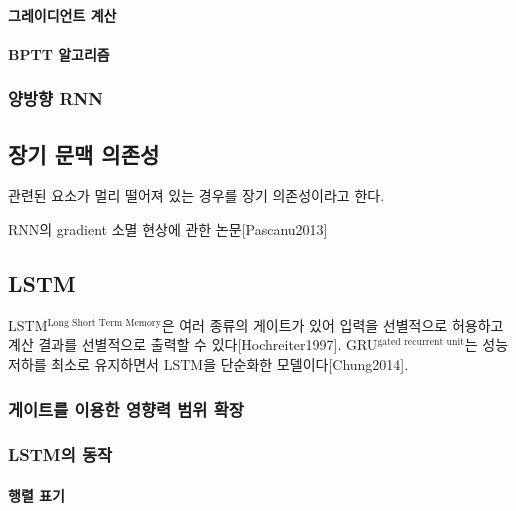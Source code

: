 \documentclass [12pt] {oblivoir}
\let\oldsubsubsection=\subsubsection
\renewcommand{\subsubsection}
{
  \filbreak
  \oldsubsubsection
}
\begin{document}
\vspace{3mm}

\paragraph*{그레이디언트 계산}\mbox{}

\vspace{3mm}

\paragraph*{BPTT 알고리즘}\mbox{}

\vspace{3mm}

\subsubsection{양방향 RNN}

\subsection{장기 문맥 의존성}

관련된 요소가 멀리 떨어져 있는 경우를 장기 의존성이라고 한다.

RNN의 gradient 소멸 현상에 관한 논문[Pascanu2013]

\subsection{LSTM}

LSTM$^{\text{Long Short Term Memory}}$은 여러 종류의 게이트가 있어 입력을 선별적으로 허용하고 계산 결과를 선별적으로 출력할 수 있다[Hochreiter1997].
GRU$^{\text{gated recurrent unit}}$는 성능 저하를 최소로 유지하면서 LSTM을 단순화한 모델이다[Chung2014].

\subsubsection{게이트를 이용한 영향력 범위 확장}

\subsubsection{LSTM의 동작}

\paragraph*{행렬 표기}\mbox{}
\end{document}

